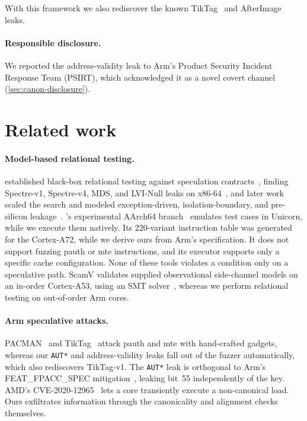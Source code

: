 With this framework we also rediscover the known TikTag~\cite{tiktag} and
AfterImage~\cite{afterimage} leaks.

\paragraph{Responsible disclosure.}
We reported the address-validity leak to Arm's Product Security Incident Response Team (PSIRT),
which acknowledged it as a novel covert channel (\autoref{sec:canon-disclosure}).

\section{Related work}
\label{sec:intro-related}

\paragraph{Model-based relational testing.}
\revizor{} established black-box relational testing against speculation
contracts~\cite{revizor,contracts}, finding Spectre-v1, Spectre-v4, MDS, and LVI-Null leaks on
x86-64~\cite{revizor,revizor_micro}, and later work scaled the search and modeled
exception-driven, isolation-boundary, and pre-silicon
leakage~\cite{hide_seek,speculation_fault,isolation,amulet}. \revizor{}'s experimental AArch64
branch~\cite{revizor_arm} emulates test cases in Unicorn, while we execute them natively. Its 220-variant instruction table was generated for the Cortex-A72,
while we derive ours from Arm's specification. It does not support fuzzing \gls{pauth} or
\gls{mte} instructions, and its executor supports only a specific cache configuration. None of
these tools violates a condition only on a speculative path. ScamV validates supplied
observational side-channel models on an in-order Cortex-A53, using an SMT
solver~\cite{scamv,scamv_micro}, whereas we perform relational testing on out-of-order Arm cores.

\paragraph{Arm speculative attacks.}
PACMAN~\cite{pacman} and TikTag~\cite{tiktag} attack \gls{pauth} and \gls{mte} with
hand-crafted gadgets, whereas our \texttt{AUT*} and address-validity leaks fall out of the fuzzer
automatically, which also rediscovers TikTag-v1. The \texttt{AUT*} leak is orthogonal to Arm's
FEAT\_FPACC\_SPEC mitigation~\cite{arm_fpacc_spec}, leaking bit~55 independently of the key.
AMD's CVE-2020-12965~\cite{noncanonical_amd,amd_sb1010} lets a core transiently execute a
non-canonical load. Ours exfiltrates information through the canonicality and alignment checks themselves.

